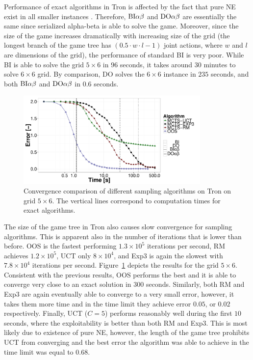 Performance of exact algorithms in Tron is affected by the fact that pure NE exist in all smaller instances .
Therefore, $\textrm{BI}\alpha\beta$ and $\textrm{DO}\alpha\beta$ are essentially the same since serialized alpha-beta is able to solve the game.
Moreover, since the size of the game increases dramatically with increasing size of the grid (the longest branch of the game tree has $\left(0.5\cdot w\cdot l - 1\right)$ joint actions, where $w$ and $l$ are dimensions of the grid), the performance of standard BI is very poor.
While BI is able to solve the grid $5\times6$ in $96$ seconds, it takes around $30$ minutes to solve $6\times6$ grid.
By comparison, DO solves the $6\times6$ instance in $235$ seconds, and both $\textrm{BI}\alpha\beta$ and $\textrm{DO}\alpha\beta$ in $0.6$ seconds.

\begin{figure}[t]
\centering
\includegraphics[width=0.85\textwidth]{figures/convergence-tron.pdf}
\caption{Convergence comparison of different sampling algorithms on Tron on grid $5\times6$. The vertical lines correspond to computation times for exact algorithms.} \label{fig:off:conv:tron}
\end{figure}

The size of the game tree in Tron also causes slow convergence for sampling algorithms.
This is apparent also in the number of iterations that is lower than before.
OOS is the fastest performing $1.3\times 10^5$ iterations per second, RM achieves $1.2\times 10^5$, UCT only $8\times10^4$, and Exp3 is again the slowest with $7.8\times10^4$ iterations per second.
Figure~\ref{fig:off:conv:tron} depicts the results for the grid $5\times6$.
Consistent with the previous results, OOS performs the best and it is able to converge very close to an exact solution in $300$ seconds.
Similarly, both RM and Exp3 are again eventually able to converge to a very small error, however, it takes them more time and in the time limit they achieve error $0.05$, or $0.02$ respectively.
Finally, UCT ($C=5$) performs reasonably well during the first $10$ seconds, where the exploitability is better than both RM and Exp3.
This is most likely due to existence of pure NE, however, the length of the game tree prohibits UCT from converging and the best error the algorithm was able to achieve in the time limit was equal to $0.68$.

